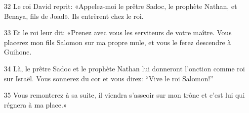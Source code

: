 
32 Le roi David reprit: «Appelez-moi le prêtre Sadoc, le prophète Nathan, et Benaya, fils de Joad». Ils entrèrent chez le roi.

33 Et le roi leur dit: «Prenez avec vous les serviteurs de votre maître. Vous placerez mon fils Salomon sur ma propre mule, et vous le ferez descendre à Guihone.

34 Là, le prêtre Sadoc et le prophète Nathan lui donneront l’onction comme roi sur Israël. Vous sonnerez du cor et vous direz: “Vive le roi Salomon!”

35 Vous remonterez à sa suite, il viendra s’asseoir sur mon trône et c’est lui qui régnera à ma place.»
